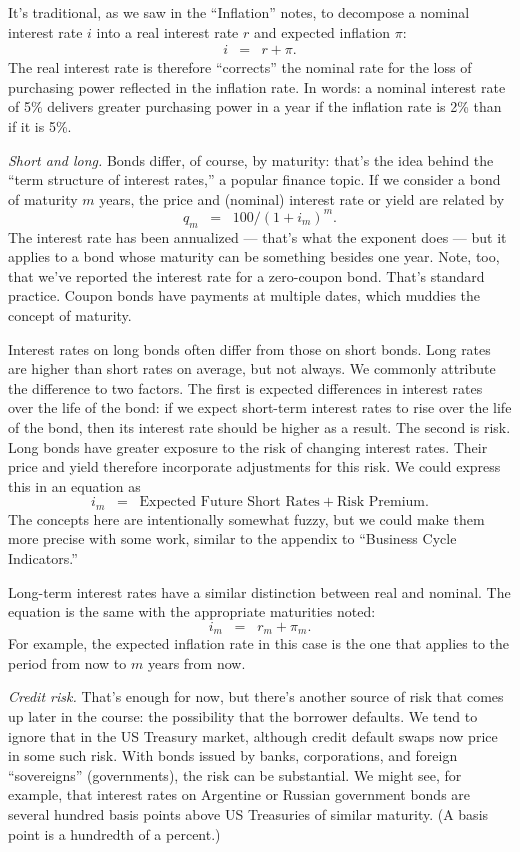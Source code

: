 \documentclass[letterpaper,12pt]{article}
\begin{document}
It's traditional, as we saw in the ``Inflation'' notes,
to decompose a nominal interest rate $i$
into a real interest rate $r$
and expected inflation $\pi$:
%
\begin{eqnarray}
    i &=& r + \pi .
    \label{eq:fisher}%
\end{eqnarray}
%
The real interest rate is therefore
``corrects'' the nominal rate for the loss of purchasing power
reflected in the inflation rate.
In words:  a nominal interest rate of 5\%
delivers greater purchasing power in a year
if the inflation rate is 2\% than if it is 5\%.

{\it Short and long.\/}
Bonds differ, of course, by maturity:  that's
the idea behind the ``term structure of interest rates,''
a popular finance topic.
If we consider a bond of maturity $m$ years,
the price and (nominal) interest rate or yield are related by
\[
    q_m \;\;=\;\;  100/(1+i_m)^m .
\]
The interest rate has been annualized ---
that's what the exponent does ---
but it applies
to a bond whose maturity can be something besides one year.
Note, too, that we've reported the interest rate
for a zero-coupon bond.
That's standard practice.
Coupon bonds have payments at multiple dates, which
muddies the concept of maturity.

Interest rates on long bonds often differ from those on short bonds.
Long rates are higher than short rates on average,
but not always.
We commonly attribute the difference to two factors.
The first is expected differences in interest rates over the life of the bond:
if we expect short-term interest rates to rise over the life
of the bond, then its interest rate should be higher
as a result.
The second is risk.
Long bonds have greater exposure to the risk of changing interest rates.
Their price and yield therefore incorporate adjustments for this risk.
We could express this in an equation as
\[
    i_m \;\;=\;\; \mbox{Expected Future Short Rates}
                  +  \mbox{Risk Premium} .
\]
The concepts here are intentionally somewhat fuzzy,
but we could make them more precise with some work,
similar to the appendix to ``Business Cycle Indicators.''


Long-term interest rates have a similar distinction between real and nominal.
The equation is the same with the appropriate maturities noted:
\[
    i_m \;\;=\;\; r_m + \pi_m .
\]
For example, the expected inflation rate in this case is the one
that applies to the period from now to $m$ years from now.

{\it Credit risk.\/}
That's enough for now, but there's another source of risk
that comes up later in the course:
the possibility that the borrower defaults.
We tend to ignore that in the US Treasury market, although
credit default swaps now price in some such risk.
With bonds issued by banks, corporations, and foreign ``sovereigns''
(governments), the risk can be substantial.
We might see, for example, that interest rates on Argentine or Russian
government bonds are several hundred basis points above US Treasuries
of similar maturity.
(A basis point is a hundredth of a percent.)
\end{document}
